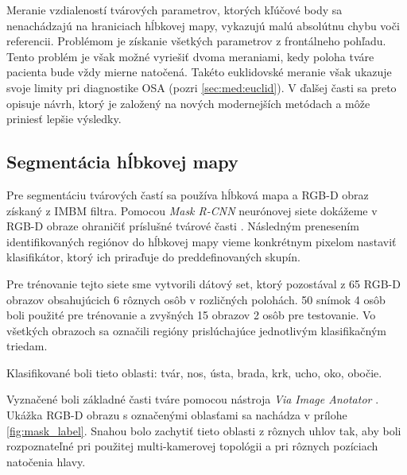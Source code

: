 Meranie vzdialeností tvárových parametrov, ktorých kľúčové body sa nenachádzajú na hraniciach hĺbkovej mapy, vykazujú malú absolútnu chybu voči referencii. Problémom je získanie všetkých parametrov z frontálneho pohľadu. Tento problém je však možné vyriešiť dvoma meraniami, kedy poloha tváre pacienta bude vždy mierne natočená. Takéto euklidovské meranie však ukazuje svoje limity pri diagnostike OSA (pozri \ref{sec:med:euclid}). V ďalšej časti sa preto opisuje návrh, ktorý je založený na nových modernejších metódach a môže priniesť lepšie výsledky.

\newpage
\subsection{Segmentácia hĺbkovej mapy}

Pre segmentáciu tvárových častí sa používa hĺbková mapa a RGB-D obraz získaný z IMBM filtra. Pomocou \textit{Mask R-CNN} neurónovej siete dokážeme v RGB-D obraze ohraničiť príslušné tvárové časti \cite{he2017mask}. Následným prenesením identifikovaných regiónov do hĺbkovej mapy vieme konkrétnym pixelom nastaviť klasifikátor, ktorý ich priraďuje do preddefinovaných skupín. 

%

Pre trénovanie tejto siete sme vytvorili dátový set, ktorý pozostával z 65 RGB-D obrazov obsahujúcich 6 rôznych osôb v rozličných polohách. 50 snímok 4 osôb boli použité pre trénovanie a zvyšných 15 obrazov 2 osôb pre testovanie. Vo všetkých obrazoch sa označili regióny prislúchajúce jednotlivým klasifikačným triedam.\newline

\noindent Klasifikované boli tieto oblasti: tvár, nos, ústa, brada, krk, ucho, oko, obočie. 

Vyznačené boli základné časti tváre pomocou nástroja \textit{Via Image Anotator} \cite{dutta2019vgg}. Ukážka RGB-D obrazu s označenými oblasťami sa nachádza v prílohe \ref{fig:mask_label}. Snahou bolo zachytiť tieto oblasti z rôznych uhlov tak, aby boli rozpoznateľné pri použitej multi-kamerovej topológii a pri rôznych pozíciach natočenia hlavy. 

